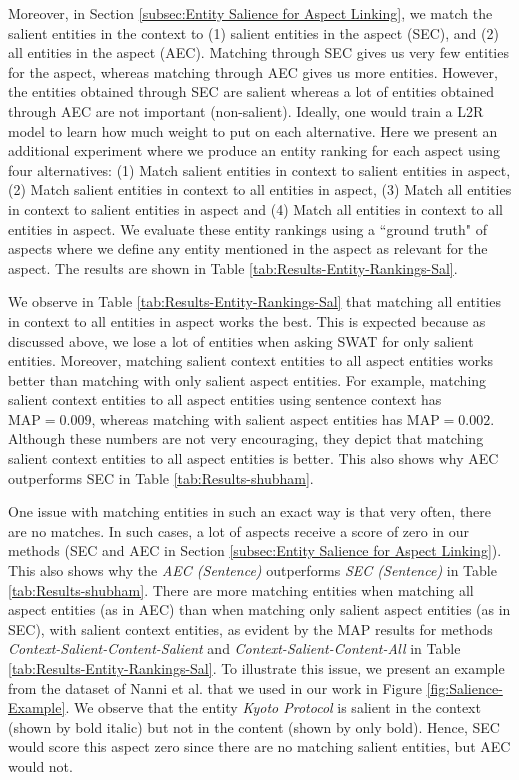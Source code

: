 Moreover, in Section \ref{subsec:Entity Salience for Aspect Linking}, we match the salient entities in the context to (1) salient entities in the aspect (SEC), and (2) all entities in the aspect (AEC). Matching through SEC gives us very few entities for the aspect, whereas matching through AEC gives us more entities. However, the entities obtained through SEC are salient whereas a lot of entities obtained through AEC are not important (non-salient). Ideally, one would train a L2R model to learn how much weight to put on each alternative. Here we present an additional experiment where we produce an entity ranking for each aspect using four alternatives: (1) Match salient entities in context to salient entities in aspect, (2) Match salient entities in context to all entities in aspect, (3) Match all entities in context to salient entities in aspect and (4) Match all entities in context to all entities in aspect. We evaluate these entity rankings using a ``ground truth" of aspects where we define any entity mentioned in the aspect as relevant for the aspect. The results are shown in Table \ref{tab:Results-Entity-Rankings-Sal}. 



We observe in Table \ref{tab:Results-Entity-Rankings-Sal} that matching all entities in context to all entities in aspect works the best. This is expected because as discussed above, we lose a lot of entities when asking SWAT for only salient entities. Moreover, matching salient context entities to all aspect entities works better than matching with only salient aspect entities. For example, matching salient context entities to all aspect entities using sentence context has $\text{MAP}=0.009$, whereas matching with salient aspect entities has $\text{MAP}=0.002$. Although these numbers are not very encouraging, they depict that matching salient context entities to all aspect entities is better. This also shows why AEC outperforms SEC in Table \ref{tab:Results-shubham}.

One issue with matching entities in such an exact way is that very often, there are no matches. In such cases, a lot of aspects receive a score of zero in our methods (SEC and AEC in Section \ref{subsec:Entity Salience for Aspect Linking}). This also shows why the \textit{AEC (Sentence)} outperforms  \textit{SEC (Sentence)} in Table \ref{tab:Results-shubham}. There are more matching entities when matching all aspect entities (as in AEC) than when matching only salient aspect entities (as in SEC), with salient context entities, as evident by the MAP results for methods \textit{Context-Salient-Content-Salient} and \textit{Context-Salient-Content-All} in Table \ref{tab:Results-Entity-Rankings-Sal}. To illustrate this issue, we present an example from the dataset of Nanni et al.\cite{nanni2018entity} that we used in our work in Figure \ref{fig:Salience-Example}. We observe that the entity \textit{Kyoto Protocol} is salient in the context (shown by bold italic) but not in the content (shown by only bold). Hence, SEC would score this aspect zero since there are no matching salient entities, but AEC would not.


